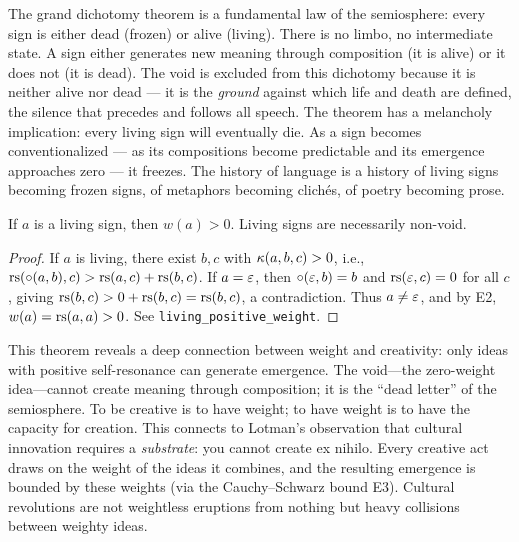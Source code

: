 \begin{interpretation}
The grand dichotomy theorem is a fundamental law of the semiosphere:
every sign is either dead (frozen) or alive (living). There is no
limbo, no intermediate state. A sign either generates new meaning
through composition (it is alive) or it does not (it is dead). The
void is excluded from this dichotomy because it is neither alive nor
dead --- it is the \emph{ground} against which life and death are
defined, the silence that precedes and follows all speech. The theorem
has a melancholy implication: every living sign will eventually die.
As a sign becomes conventionalized --- as its compositions become
predictable and its emergence approaches zero --- it freezes. The
history of language is a history of living signs becoming frozen signs,
of metaphors becoming clich\'es, of poetry becoming prose.
\end{interpretation}

\begin{theorem}
\label{thm:living-positive-weight}
If $a$ is a living sign, then $w(a) > 0$. Living signs are necessarily non-void.
\end{theorem}

\begin{proof}
If $a$ is living, there exist $b, c$ with $\kappa(a, b, c) > 0$, i.e., $\mathrm{rs}(\circ(a, b), c) > \mathrm{rs}(a, c) + \mathrm{rs}(b, c)$. If $a = \varepsilon$, then $\circ(\varepsilon, b) = b$ and $\mathrm{rs}(\varepsilon, c) = 0$ for all $c$, giving $\mathrm{rs}(b, c) > 0 + \mathrm{rs}(b, c) = \mathrm{rs}(b, c)$, a contradiction. Thus $a \neq \varepsilon$, and by E2, $w(a) = \mathrm{rs}(a, a) > 0$. See \texttt{living\_positive\_weight}.
\end{proof}

\begin{interpretation}
This theorem reveals a deep connection between weight and creativity: only ideas with positive self-resonance can generate emergence. The void---the zero-weight idea---cannot create meaning through composition; it is the ``dead letter'' of the semiosphere. To be creative is to have weight; to have weight is to have the capacity for creation. This connects to Lotman's observation that cultural innovation requires a \emph{substrate}: you cannot create ex nihilo. Every creative act draws on the weight of the ideas it combines, and the resulting emergence is bounded by these weights (via the Cauchy--Schwarz bound E3). Cultural revolutions are not weightless eruptions from nothing but heavy collisions between weighty ideas.
\end{interpretation}

